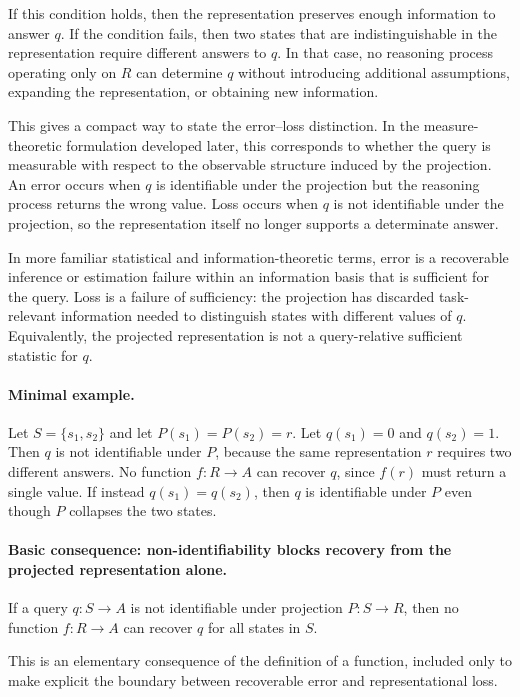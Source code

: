 \documentclass[11pt]{article}
\begin{document}
If this condition holds, then the representation preserves enough information to answer $q$. If the condition fails, then two states that are indistinguishable in the representation require different answers to $q$. In that case, no reasoning process operating only on $R$ can determine $q$ without introducing additional assumptions, expanding the representation, or obtaining new information.

This gives a compact way to state the error--loss distinction. In the measure-theoretic formulation developed later, this corresponds to whether the query is measurable with respect to the observable structure induced by the projection. An error occurs when $q$ is identifiable under the projection but the reasoning process returns the wrong value. Loss occurs when $q$ is not identifiable under the projection, so the representation itself no longer supports a determinate answer.

In more familiar statistical and information-theoretic terms, error is a recoverable inference or estimation failure within an information basis that is sufficient for the query. Loss is a failure of sufficiency: the projection has discarded task-relevant information needed to distinguish states with different values of $q$. Equivalently, the projected representation is not a query-relative sufficient statistic for $q$.

\paragraph{Minimal example.}
Let $S=\{s_1,s_2\}$ and let $P(s_1)=P(s_2)=r$. Let $q(s_1)=0$ and $q(s_2)=1$. Then $q$ is not identifiable under $P$, because the same representation $r$ requires two different answers. No function $f:R\rightarrow A$ can recover $q$, since $f(r)$ must return a single value. If instead $q(s_1)=q(s_2)$, then $q$ is identifiable under $P$ even though $P$ collapses the two states.

\paragraph{Basic consequence: non-identifiability blocks recovery from the projected representation alone.}
If a query $q:S\rightarrow A$ is not identifiable under projection $P:S\rightarrow R$, then no function $f:R\rightarrow A$ can recover $q$ for all states in $S$.

This is an elementary consequence of the definition of a function, included only to make explicit the boundary between recoverable error and representational loss.
\end{document}
